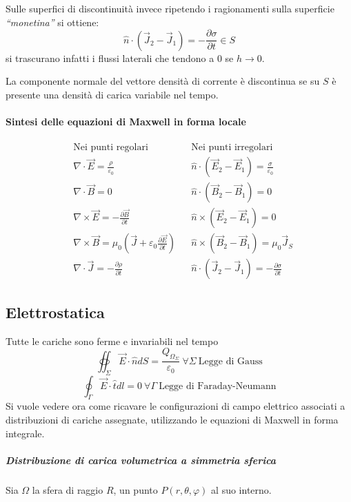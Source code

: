 Sulle superfici di discontinuità invece ripetendo i ragionamenti sulla superficie \textit{``monetina''}
si ottiene:
$$
\hat{n}\cdot\left(\vec{J}_2-\vec{J}_1\right) = -\frac{\partial\sigma}{\partial t} \in S
$$
si trascurano infatti i flussi laterali che tendono a 0 se $h\to 0$.

La componente normale del vettore densità di corrente è discontinua se su $S$ è presente una densità
di carica variabile nel tempo.

\paragraph{Sintesi delle equazioni di Maxwell in forma locale} 
\begin{align*}
&\text{Nei punti}\text{ regolari}  & &\text{Nei punti}\text{ irreg}\text{olari}\\
&\nabla\cdot\vec{E} = \frac{\rho}{\varepsilon_0} & &\hat{n}\cdot(\vec{E}_2-\vec{E}_1) = \frac{\sigma}{\varepsilon_0}\\
&\nabla\cdot\vec{B} = 0 & &\hat{n}\cdot(\vec{B}_2-\vec{B}_1) = 0\\
&\nabla\times\vec{E} = -\frac{\partial\vec{B}}{\partial t}& &\hat{n}\times(\vec{E}_2-\vec{E}_1) = 0\\
&\nabla\times\vec{B} = \mu_0\left(\vec{J} + \varepsilon_0\frac{\partial\vec{E}}{\partial t}\right)& &\hat{n}\times(\vec{B}_2-\vec{B}_1) = \mu_0\vec{J}_S \\
&\nabla\cdot\vec{J} = -\frac{\partial\rho}{\partial t} & &\hat{n}\cdot(\vec{J}_2-\vec{J}_1) = -\frac{\partial \sigma}{\partial t}
\end{align*}

\subsection{Elettrostatica}
Tutte le cariche sono ferme e invariabili nel tempo
$$
\oiint_\Sigma \vec{E}\cdot\hat{n}dS = \frac{Q_{\Omega_\Sigma}}{\varepsilon_0}\ \forall\Sigma\ \text{Legge di Gauss}
$$
$$
\oint_\Gamma \vec{E}\cdot\hat{t}dl = 0 \ \forall\Gamma\ \text{Legge di Faraday-Neumann}
$$
Si vuole vedere ora come ricavare le configurazioni di campo elettrico associati a distribuzioni
di cariche assegnate, utilizzando le equazioni di Maxwell in forma integrale.

\subparagraph{Distribuzione di carica volumetrica a simmetria sferica}

Sia $\Omega$ la sfera di raggio $R$, un punto $P(r,\theta,\varphi)$ al suo interno.

